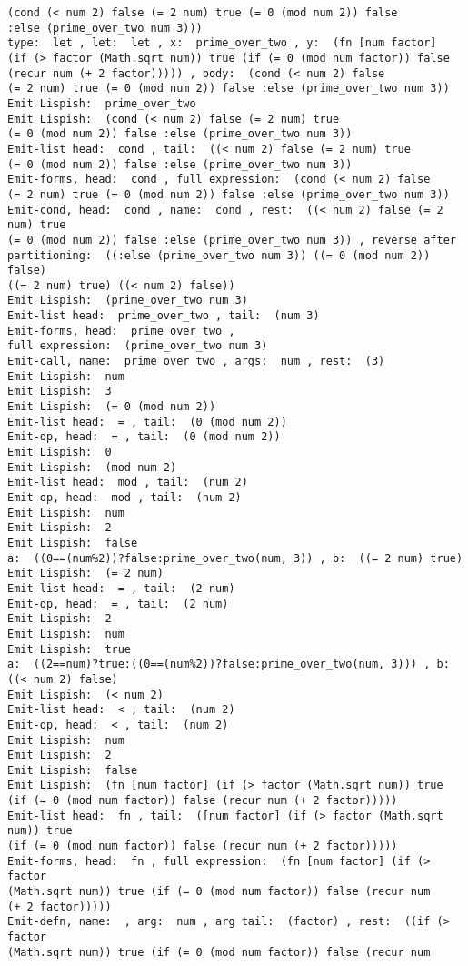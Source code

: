 \begin{verbatim}
(cond (< num 2) false (= 2 num) true (= 0 (mod num 2)) false 
:else (prime_over_two num 3)))
type:  let , let:  let , x:  prime_over_two , y:  (fn [num factor] 
(if (> factor (Math.sqrt num)) true (if (= 0 (mod num factor)) false 
(recur num (+ 2 factor))))) , body:  (cond (< num 2) false 
(= 2 num) true (= 0 (mod num 2)) false :else (prime_over_two num 3))
Emit Lispish:  prime_over_two
Emit Lispish:  (cond (< num 2) false (= 2 num) true 
(= 0 (mod num 2)) false :else (prime_over_two num 3))
Emit-list head:  cond , tail:  ((< num 2) false (= 2 num) true 
(= 0 (mod num 2)) false :else (prime_over_two num 3))
Emit-forms, head:  cond , full expression:  (cond (< num 2) false 
(= 2 num) true (= 0 (mod num 2)) false :else (prime_over_two num 3))
Emit-cond, head:  cond , name:  cond , rest:  ((< num 2) false (= 2 num) true 
(= 0 (mod num 2)) false :else (prime_over_two num 3)) , reverse after
partitioning:  ((:else (prime_over_two num 3)) ((= 0 (mod num 2)) false) 
((= 2 num) true) ((< num 2) false))
Emit Lispish:  (prime_over_two num 3)
Emit-list head:  prime_over_two , tail:  (num 3)
Emit-forms, head:  prime_over_two , 
full expression:  (prime_over_two num 3)
Emit-call, name:  prime_over_two , args:  num , rest:  (3)
Emit Lispish:  num
Emit Lispish:  3
Emit Lispish:  (= 0 (mod num 2))
Emit-list head:  = , tail:  (0 (mod num 2))
Emit-op, head:  = , tail:  (0 (mod num 2))
Emit Lispish:  0
Emit Lispish:  (mod num 2)
Emit-list head:  mod , tail:  (num 2)
Emit-op, head:  mod , tail:  (num 2)
Emit Lispish:  num
Emit Lispish:  2
Emit Lispish:  false
a:  ((0==(num%2))?false:prime_over_two(num, 3)) , b:  ((= 2 num) true)
Emit Lispish:  (= 2 num)
Emit-list head:  = , tail:  (2 num)
Emit-op, head:  = , tail:  (2 num)
Emit Lispish:  2
Emit Lispish:  num
Emit Lispish:  true
a:  ((2==num)?true:((0==(num%2))?false:prime_over_two(num, 3))) , b:  
((< num 2) false)
Emit Lispish:  (< num 2)
Emit-list head:  < , tail:  (num 2)
Emit-op, head:  < , tail:  (num 2)
Emit Lispish:  num
Emit Lispish:  2
Emit Lispish:  false
Emit Lispish:  (fn [num factor] (if (> factor (Math.sqrt num)) true 
(if (= 0 (mod num factor)) false (recur num (+ 2 factor)))))
Emit-list head:  fn , tail:  ([num factor] (if (> factor (Math.sqrt num)) true 
(if (= 0 (mod num factor)) false (recur num (+ 2 factor)))))
Emit-forms, head:  fn , full expression:  (fn [num factor] (if (> factor 
(Math.sqrt num)) true (if (= 0 (mod num factor)) false (recur num 
(+ 2 factor)))))
Emit-defn, name:  , arg:  num , arg tail:  (factor) , rest:  ((if (> factor 
(Math.sqrt num)) true (if (= 0 (mod num factor)) false (recur num 

\end{verbatim}
